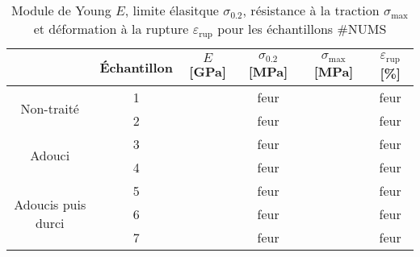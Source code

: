 \begin{table}[h]
    \centering
    \begin{tabular}{ |c||c|c|c|c|c| }
        \cline{2-6}
        \multicolumn{1}{c|}{} & Échantillon & \(E\) [GPa] & \(\sigma_{0.2}\) [MPa] & \(\sigma_{\textrm{max}}\) [MPa] & \(\varepsilon_{\textrm{rup}}\) [\%] \\
        \hline
        \multirow{2}{4cm}{Non-traité} & 1 &  & feur &  & feur \\
        & 2 &  & feur &  & feur \\
        \hline
        \multirow{2}{4cm}{Adouci} & 3 &  & feur &  & feur \\
        & 4 &  & feur &  & feur \\
        \hline
        \multirow{3}{4cm}{Adoucis puis durci} & 5 &  & feur &  & feur \\
        & 6 &  & feur &  & feur \\
        & 7 &  & feur &  & feur \\
        \hline
    \end{tabular}
    \caption{Module de Young \(E\), limite élasitque \(\sigma_{0.2}\), résistance à la traction \(\sigma_{\textrm{max}}\) et déformation à la rupture \(\varepsilon_{\textrm{rup}}\) pour les échantillons \#NUMS}
    \label{tab:results}
\end{table}